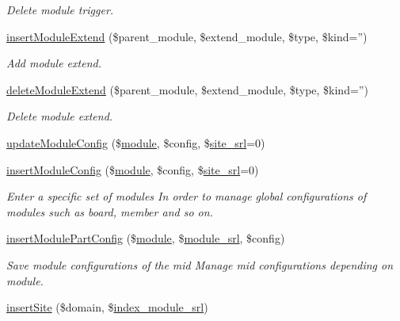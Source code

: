 \begin{DoxyCompactItemize}
\begin{DoxyCompactList}\small\item\em Delete module trigger. \end{DoxyCompactList}\item 
\hyperlink{classmoduleController_a74076ed057c3d3671a364fa478aa1109}{insert\-Module\-Extend} (\$parent\-\_\-module, \$extend\-\_\-module, \$type, \$kind='')
\begin{DoxyCompactList}\small\item\em Add module extend. \end{DoxyCompactList}\item 
\hyperlink{classmoduleController_a74f94763f4e60fef8a0e4e4dabf777e0}{delete\-Module\-Extend} (\$parent\-\_\-module, \$extend\-\_\-module, \$type, \$kind='')
\begin{DoxyCompactList}\small\item\em Delete module extend. \end{DoxyCompactList}\item 
\hyperlink{classmoduleController_aa6d6239d1fd7c1f64f7061778ad4127b}{update\-Module\-Config} (\$\hyperlink{classmodule}{module}, \$config, \$\hyperlink{ko_8install_8php_a8b1406b4ad1048041558dce6bfe89004}{site\-\_\-srl}=0)
\item 
\hyperlink{classmoduleController_a678c87caaf6b2d12e63237d87b11b7a9}{insert\-Module\-Config} (\$\hyperlink{classmodule}{module}, \$config, \$\hyperlink{ko_8install_8php_a8b1406b4ad1048041558dce6bfe89004}{site\-\_\-srl}=0)
\begin{DoxyCompactList}\small\item\em Enter a specific set of modules In order to manage global configurations of modules such as board, member and so on. \end{DoxyCompactList}\item 
\hyperlink{classmoduleController_a7def19c7b7f3f3e0d97a2183d58d62eb}{insert\-Module\-Part\-Config} (\$\hyperlink{classmodule}{module}, \$\hyperlink{ko_8install_8php_a370bb6450fab1da3e0ed9f484a38b761}{module\-\_\-srl}, \$config)
\begin{DoxyCompactList}\small\item\em Save module configurations of the mid Manage mid configurations depending on module. \end{DoxyCompactList}\item 
\hyperlink{classmoduleController_acca9e2ce3fbb24f614816bb4c34a5506}{insert\-Site} (\$domain, \$\hyperlink{ko_8install_8php_acd0b17bfe6d14c82871d73fa39c9c22d}{index\-\_\-module\-\_\-srl})

\end{DoxyCompactItemize}
